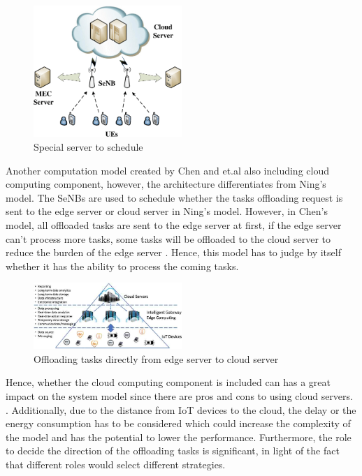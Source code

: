 \documentclass[a4paper,11pt]{article}
\begin{document}
\begin{figure}[h]
        \centering
        \includegraphics[width=0.5\textwidth]{SeNBs.png}
        \caption{Special server to schedule \cite{A_Cooperative_Partial_Computation_Offloading_Scheme_for_Mobile_Edge}}
\end{figure}

Another computation model created by Chen and et.al also including cloud computing component, however, the architecture differentiates from Ning's model. The SeNBs are used to schedule whether the tasks offloading request is sent to the edge server or cloud server in Ning's model. However, in Chen's model, all offloaded tasks are sent to the edge server at first, if the edge server can't process more tasks, some tasks will be offloaded to the cloud server to reduce the burden of the edge server \cite{cloud_2_edgeconnectedtocloud}. Hence, this model has to judge by itself whether it has the ability to process the coming tasks.\newline 

\begin{figure}[h]
        \centering
        \includegraphics[width=0.5\textwidth]{edgeconnectedcloud.jpg}
        \caption{Offloading tasks directly from edge server to cloud server \cite{aim_offloading}}
\end{figure}
\newpage
Hence, whether the cloud computing component is included can has a great impact on the system model since there are pros and cons to using cloud servers. . Additionally, due to the distance from IoT devices to the cloud, the delay or the energy consumption has to be considered which could increase the complexity of the model and has the potential to lower the performance. Furthermore, the role to decide the direction of the offloading tasks is significant, in light of the fact that different roles would select different strategies. 
\end{document}
